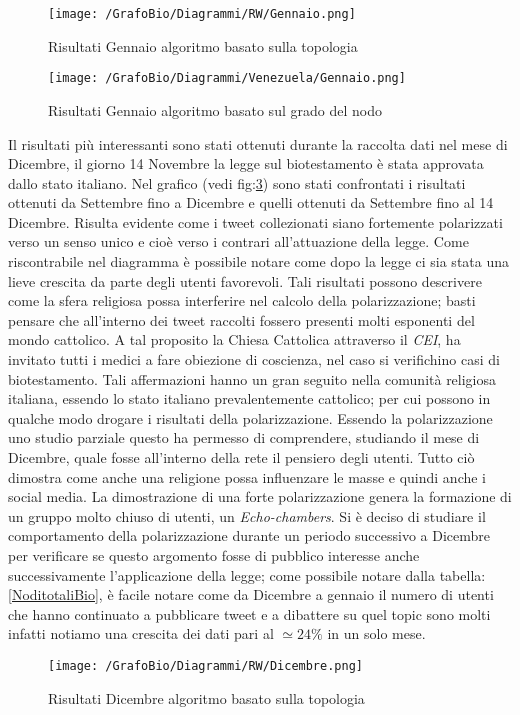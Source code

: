 \begin{figure}[!ht]
\centering
\texttt{[image: /GrafoBio/Diagrammi/RW/Gennaio.png]}
\caption{Risultati Gennaio algoritmo basato sulla topologia}
\label{diagrammaGen1}
\end{figure}
\begin{figure}[!ht]
\centering
\texttt{[image: /GrafoBio/Diagrammi/Venezuela/Gennaio.png]}
\caption{Risultati Gennaio algoritmo basato sul grado del nodo}
\label{diagrammaGen2}
\end{figure}

Il risultati più interessanti sono stati ottenuti durante la raccolta dati nel mese di Dicembre, il giorno 14 Novembre la legge sul biotestamento è stata approvata dallo stato italiano. Nel grafico (vedi fig:\ref{DicembrevsDicembre}) sono stati confrontati i risultati ottenuti da Settembre fino a Dicembre e quelli ottenuti da Settembre fino al 14 Dicembre. Risulta evidente come i tweet collezionati siano fortemente polarizzati verso un senso unico e cioè verso i contrari all'attuazione della legge. Come riscontrabile nel diagramma è possibile notare come dopo la legge ci sia stata una lieve crescita da parte degli utenti favorevoli.
Tali risultati possono descrivere come la sfera religiosa possa interferire nel calcolo della polarizzazione; basti pensare che all'interno dei tweet raccolti fossero presenti molti esponenti del mondo cattolico.
A tal proposito la Chiesa Cattolica attraverso il \textit{CEI}, ha invitato tutti i medici a fare obiezione di coscienza, nel caso si verifichino casi di biotestamento. Tali affermazioni hanno un gran seguito nella comunità religiosa italiana, essendo lo stato italiano prevalentemente cattolico; per cui possono in qualche modo drogare i risultati della polarizzazione.\cite{BiotestamentoCris}
Essendo la polarizzazione uno studio parziale questo ha permesso di comprendere, studiando il mese di Dicembre, quale fosse all'interno della rete il pensiero degli utenti. Tutto ciò dimostra come anche una religione possa influenzare le masse e quindi anche i social media.
La dimostrazione di una forte polarizzazione genera la formazione di un gruppo molto chiuso di utenti, un \textit{Echo-chambers}. 
Si è deciso di studiare il comportamento della polarizzazione durante un periodo successivo a Dicembre per verificare se questo argomento fosse di pubblico interesse anche successivamente l'applicazione della legge; come possibile notare dalla tabella: \ref{NoditotaliBio}, è facile notare come da Dicembre a gennaio il numero di utenti che hanno continuato a pubblicare tweet e a dibattere su quel topic sono molti infatti notiamo una crescita dei dati pari al $\simeq 24\%$ in un solo mese.
\begin{figure}[!ht]
\centering
\texttt{[image: /GrafoBio/Diagrammi/RW/Dicembre.png]}
\caption{Risultati Dicembre algoritmo basato sulla topologia}
\label{DicembrevsDicembre}
\end{figure}

